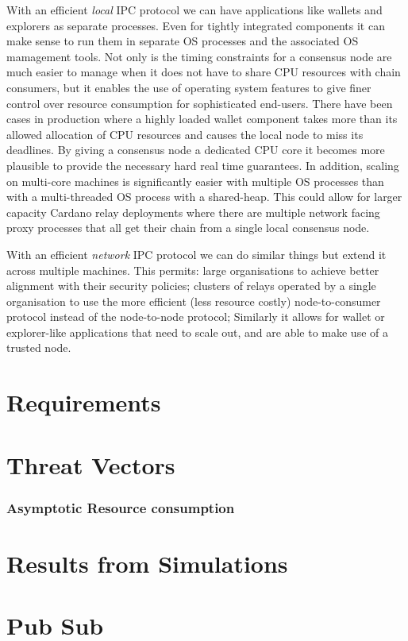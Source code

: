 \documentclass{report}
\theoremstyle{definition}{
  \newtheorem{lemma}{Lemma}[section] %
  \newtheorem{definition}[lemma]{Definition}
}
\theoremstyle{theorem}{
  \newtheorem{invariant}[lemma]{Invariant}
  \newtheorem{proofobligation}[lemma]{Proof Obligation}
}
\numberwithin{equation}{lemma}
\begin{document}
With an efficient \emph{local} IPC protocol we can have applications
like wallets and explorers as separate processes. Even for tightly
integrated components it can make sense to run them in separate OS
processes and the associated OS mamagement tools. Not only is the
timing constraints for a consensus node are much easier to manage when
it does not have to share CPU resources with chain consumers, but it
enables the use of operating system features to give finer control
over resource consumption for sophisticated end-users.  There have
been cases in production where a highly loaded wallet component takes
more than its allowed allocation of CPU resources and causes the local
node to miss its deadlines.  By giving a consensus node a dedicated
CPU core it becomes more plausible to provide the necessary hard real
time guarantees. In addition, scaling on multi-core machines is
significantly easier with multiple OS processes than with a
multi-threaded OS process with a shared-heap. This could allow for
larger capacity Cardano relay deployments where there are multiple
network facing proxy processes that all get their chain from a single
local consensus node.

With an efficient \emph{network} IPC protocol we can do similar things
but extend it across multiple machines. This permits: large
organisations to achieve better alignment with their security
policies; clusters of relays operated by a single organisation to use
the more efficient (less resource costly) node-to-consumer protocol
instead of the node-to-node protocol; Similarly it allows for wallet
or explorer-like applications that need to scale out, and are able to
make use of a trusted node.

\section{Requirements}
\section{Threat Vectors}
\subsubsection{Asymptotic Resource consumption}
\section{Results from Simulations}
\section{Pub Sub}
\end{document}
